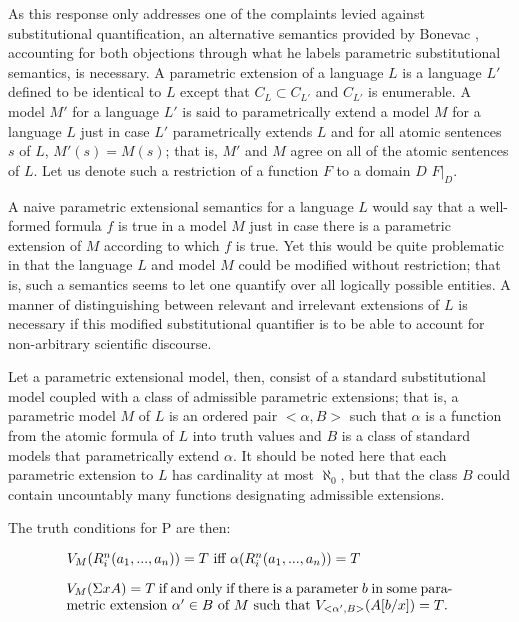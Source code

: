 \documentclass[12pt,letterpaper]{article}
\newenvironment{te}
{\begin{singlespace}
\begin{equation}
\begin{minipage}[t]{0.8\linewidth}}
{\end{minipage}
\end{equation}
\end{singlespace}
\ignorespacesafterend}
\begin{document}
\begin{doublespace}
As this response only addresses one of the complaints levied against
substitutional quantification, an alternative semantics provided by
Bonevac \cite{bonevac84}, accounting for both objections through what
he labels parametric substitutional semantics, is necessary.  A
parametric extension of a language $L$ is a language $L'$ defined to
be identical to $L$ except that $C_L \subset C_{L'}$ and $C_{L'}$ is
enumerable.  A model $M'$ for a language $L'$ is said to
parametrically extend a model $M$ for a language $L$ just in case $L'$
parametrically extends $L$ and for all atomic sentences $s$ of $L$,
$M'(s) = M(s)$; that is, $M'$ and $M$ agree on all of the atomic
sentences of $L$.  Let us denote such a restriction of a function $F$ to
a domain $D$ $F |_D$.

A naive parametric extensional semantics for a language $L$ would say
that a well-formed formula $f$ is true in a model $M$ just in case
there is a parametric extension of $M$ according to which $f$ is
true. Yet this would be quite problematic in that the language $L$ and
model $M$ could be modified without restriction; that is, such a
semantics seems to let one quantify over all logically possible
entities.  A manner of distinguishing between relevant and irrelevant
extensions of $L$ is necessary if this modified substitutional
quantifier is to be able to account for non-arbitrary scientific
discourse.

Let a parametric extensional model, then, consist of a standard
substitutional model coupled with a class of admissible parametric
extensions; that is, a parametric model $M$ of $L$ is an ordered pair
$<\alpha, B>$ such that $\alpha$ is a function from the atomic formula
of $L$ into truth values and $B$ is a class of standard models that
parametrically extend $\alpha$.  It should be noted here that each
parametric extension to $L$ has cardinality at most $\aleph_0$, but
that the class $B$ could contain uncountably many functions
designating admissible extensions.

The truth conditions for P are then:
\begin{te}
$V_M(R^n_i(a_1,...,a_n)) = T \text{ iff } \alpha(R^n_i(a_1,...,a_n)) = T$
\end{te}
\begin{te}
  $V_M(\Sigma xA) = T$ if and only if there is a parameter $b$ in some
  parametric extension $\alpha' \in B$ of $M$ such that
  $V_{<\alpha', B>}(A[b/x]) = T$.\\
  \label{ext}
\end{te} 


\end{doublespace}
\end{document}

